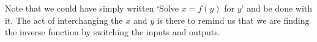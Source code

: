 \smallskip 

Note that we could have simply written `Solve $x=f(y)$ for $y$' and be done with it.  The act of interchanging the $x$ and $y$ is there to remind us that we are finding the inverse function by switching the inputs and outputs.  

